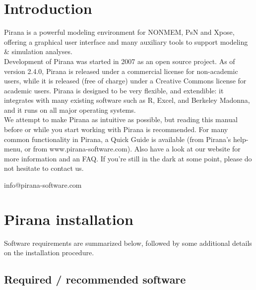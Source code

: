 
\chapter{Introduction} Pirana is a powerful
modeling environment for NONMEM, PsN and Xpose, offering a graphical
user interface and many auxiliary tools to support modeling \& simulation analyses.\\

\noindent Development of Pirana was started in 2007 as an open source
project. As of version 2.4.0, Pirana is released under a commercial
license for non-academic users, while it is released (free of charge)
under a Creative Commons license for academic users. Pirana is
designed to be very flexible, and extendible: it integrates
with many existing software such as R, Excel, and Berkeley Madonna, and it runs on all major operating systems.\\

\vspace{1pt} \noindent We attempt to make Pirana as intuitive as
possible, but reading this manual before or while you start working
with Pirana is recommended. For many
common functionality in Pirana, a Quick Guide is available (from
Pirana's help-menu, or from www.pirana-software.com). Also have a look at our website for more information and an FAQ. If you're still in the dark at some point, please do not hesitate to contact us.

\vspace{20pt}

\noindent \scriptsize{info@pirana-software.com} \normalsize


\pagebreak

\newpage  %
\thispagestyle{empty}
\mbox{}


\chapter{Pirana installation}

Software requirements are summarized below, followed by some additional details on the installation procedure.

\section{Required / recommended software}

